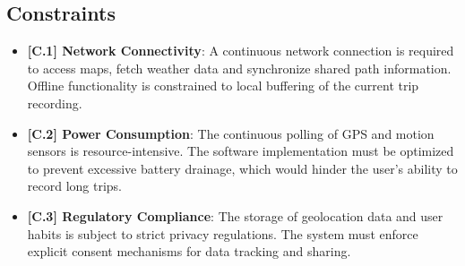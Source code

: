 \subsection{Constraints}

\begin{itemize}
    \item \textbf{[C.1] Network Connectivity}: A continuous network connection is required to access maps, fetch weather data and synchronize shared path information. Offline functionality is constrained to local buffering of the current trip recording.

    \item \textbf{[C.2] Power Consumption}: The continuous polling of GPS and motion sensors is resource-intensive. The software implementation must be optimized to prevent excessive battery drainage, which would hinder the user's ability to record long trips.

    \item \textbf{[C.3] Regulatory Compliance}: The storage of geolocation data and user habits is subject to strict privacy regulations. The system must enforce explicit consent mechanisms for data tracking and sharing.
\end{itemize}